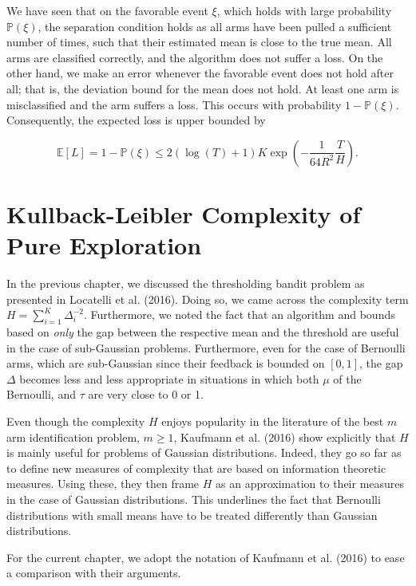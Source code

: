 \documentclass[12pt,]{article}
\begin{document}
We have seen that on the favorable event \(\xi\), which holds with large
probability \(\mathbb{P}(\xi)\), the separation condition holds as all
arms have been pulled a sufficient number of times, such that their
estimated mean is close to the true mean. All arms are classified
correctly, and the algorithm does not suffer a loss. On the other hand,
we make an error whenever the favorable event does not hold after all;
that is, the deviation bound for the mean does not hold. At least one
arm is misclassified and the arm suffers a loss. This occurs with
probability \(1-\mathbb{P}(\xi)\). Consequently, the expected loss is
upper bounded by

\[
\mathbb{E}[L] = 1 - \mathbb{P}(\xi) \leq 2(\log(T)+1)K \exp(-\frac{1}{64R^2}\frac{T}{H}).
\]

\newpage

\section{Kullback-Leibler Complexity of Pure
Exploration}\label{kullback-leibler-complexity-of-pure-exploration}

In the previous chapter, we discussed the thresholding bandit problem as
presented in Locatelli et al. (2016). Doing so, we came across the
complexity term \(H = \sum_{i=1}^{K} \Delta_i^{-2}\). Furthermore, we
noted the fact that an algorithm and bounds based on \emph{only} the gap
between the respective mean and the threshold are useful in the case of
sub-Gaussian problems. Furthermore, even for the case of Bernoulli arms,
which are sub-Gaussian since their feedback is bounded on \([0,1]\), the
gap \(\Delta\) becomes less and less appropriate in situations in which
both \(\mu\) of the Bernoulli, and \(\tau\) are very close to 0 or 1.

Even though the complexity \(H\) enjoys popularity in the literature of
the best \(m\) arm identification problem, \(m \geq 1\), Kaufmann et al.
(2016) show explicitly that \(H\) is mainly useful for problems of
Gaussian distributions. Indeed, they go so far as to define new measures
of complexity that are based on information theoretic measures. Using
these, they then frame \(H\) as an approximation to their measures in
the case of Gaussian distributions. This underlines the fact that
Bernoulli distributions with small means have to be treated differently
than Gaussian distributions.

For the current chapter, we adopt the notation of Kaufmann et al. (2016)
to ease a comparison with their arguments.
\end{document}
